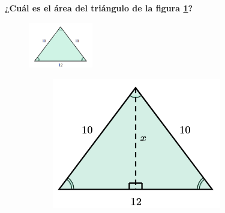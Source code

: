 \textbf{¿Cuál es el \'area del triángulo de la figura \ref{fig:area_isoseles_01}?}

\begin{figure}[H]
    \centering
    \includegraphics[width=0.25\textwidth]{../images/area_isoseles_01.png}
    \caption{}
    \label{fig:area_isoseles_01}
\end{figure}

\begin{solutionbox}{15cm}
    \begin{figure}[H]
        \centering\captionsetup[subfigure]{justification=centering}
        \begin{subfigure}{0.25\linewidth}
            \includegraphics[width=\linewidth]{../images/area_isoseles_01a.png}
            \caption{}
            \label{subfig:area_isoseles_01a}
        \end{subfigure}
        \begin{subfigure}{0.25\linewidth}

\end{subfigure}
\end{figure}
\end{solutionbox}
